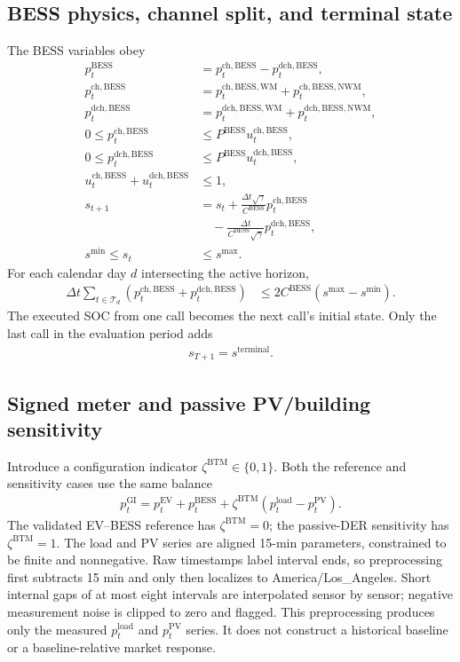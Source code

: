 \documentclass[final,5p,times]{elsarticle}
\newcommand{\dt}{\Delta t}
\newcommand{\EV}{\mathrm{EV}}
\newcommand{\BESS}{\mathrm{BESS}}
\newcommand{\GI}{\mathrm{GI}}
\newcommand{\PV}{\mathrm{PV}}
\newcommand{\WM}{\mathrm{WM}}
\newcommand{\NWM}{\mathrm{NWM}}
\newcommand{\ch}{\mathrm{ch}}
\newcommand{\dch}{\mathrm{dch}}
\newcommand{\load}{\mathrm{load}}
\newcommand{\calT}{\mathcal{T}}
\begin{document}
\subsection{BESS physics, channel split, and terminal state}
The BESS variables obey
\begin{align}
p_t^{\BESS}&=p_t^{\ch,\BESS}-p_t^{\dch,\BESS}, \label{eq:app_bess_net}\\
p_t^{\ch,\BESS}&=p_t^{\ch,\BESS,\WM}
+p_t^{\ch,\BESS,\NWM}, \label{eq:app_bess_ch_split}\\
p_t^{\dch,\BESS}&=p_t^{\dch,\BESS,\WM}
+p_t^{\dch,\BESS,\NWM}, \label{eq:app_bess_dch_split}\\
0\le p_t^{\ch,\BESS}&\le P^{\BESS}u_t^{\ch,\BESS}, \label{eq:app_bess_charge_power}\\
0\le p_t^{\dch,\BESS}&\le P^{\BESS}u_t^{\dch,\BESS}, \label{eq:app_bess_discharge_power}\\
u_t^{\ch,\BESS}+u_t^{\dch,\BESS}&\le1, \label{eq:app_bess_direction}\\
s_{t+1}&=s_t+\frac{\dt\sqrt{\gamma}}{C^{\BESS}}
p_t^{\ch,\BESS}\nonumber\\
&\quad-\frac{\dt}{C^{\BESS}\sqrt{\gamma}}
p_t^{\dch,\BESS}, \label{eq:app_bess_soc}\\
s^{\min}\le s_t&\le s^{\max}. \label{eq:app_bess_soc_bounds}
\end{align}
For each calendar day $d$ intersecting the active horizon,
\begin{align}
\dt\sum_{t\in\calT_d}
\left(p_t^{\ch,\BESS}+p_t^{\dch,\BESS}\right)
&\le2C^{\BESS}(s^{\max}-s^{\min}). \label{eq:app_bess_throughput}
\end{align}
The executed SOC from one call becomes the next call's initial state. Only the
last call in the evaluation period adds
\begin{align}
s_{T+1}=s^{\mathrm{terminal}}. \label{eq:app_terminal_soc}
\end{align}

\subsection{Signed meter and passive PV/building sensitivity}
Introduce a configuration indicator $\zeta^{\mathrm{BTM}}\in\{0,1\}$. Both
the reference and sensitivity cases use the same balance
\begin{align}
p_t^{\GI}=p_t^{\EV}+p_t^{\BESS}
+\zeta^{\mathrm{BTM}}(p_t^{\load}-p_t^{\PV}). \label{eq:app_meter_switch}
\end{align}
The validated EV--BESS reference has $\zeta^{\mathrm{BTM}}=0$; the passive-DER
sensitivity has $\zeta^{\mathrm{BTM}}=1$. The load and PV series are aligned
15-min parameters, constrained to be finite and nonnegative. Raw timestamps
label interval ends, so preprocessing first subtracts 15 min and only then
localizes to America/Los\_Angeles. Short internal gaps of at most eight
intervals are interpolated sensor by sensor; negative measurement noise is
clipped to zero and flagged. This preprocessing produces only the measured
$p_t^{\load}$ and $p_t^{\PV}$ series. It does not construct a historical
baseline or a baseline-relative market response.
\end{document}

